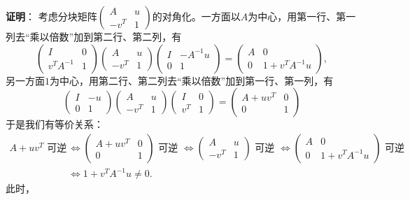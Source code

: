 {\bf 证明}： 考虑分块矩阵$\begin{pmatrix} A & u \\ -v^T & 1 \end{pmatrix}$的对角化。一方面以$A$为中心，用第一行、第一列去``乘以倍数''加到第二行、第二列，有
$$\begin{pmatrix} I & 0 \\ v^TA^{-1} & 1 \end{pmatrix} \begin{pmatrix} A & u \\ -v^T & 1 \end{pmatrix} \begin{pmatrix} I & -A^{-1}u \\ 0 & 1 \end{pmatrix} = \begin{pmatrix} A & 0 \\ 0 & 1 + v^TA^{-1}u \end{pmatrix},$$
另一方面$1$为中心，用第二行、第二列去``乘以倍数''加到第一行、第一列，有
$$\begin{pmatrix} I & -u \\ 0 & 1 \end{pmatrix} \begin{pmatrix} A & u \\ -v^T & 1 \end{pmatrix} \begin{pmatrix} I & 0 \\ v^T & 1 \end{pmatrix} = \begin{pmatrix} A + uv^T & 0 \\ 0 & 1 \end{pmatrix}$$
于是我们有等价关系：
\begin{align*}
A + uv^T \text{ 可逆 } & \Longleftrightarrow \begin{pmatrix} A + uv^T & 0 \\ 0 & 1 \end{pmatrix} \text{ 可逆 } \Longleftrightarrow \begin{pmatrix} A & u \\ -v^T & 1 \end{pmatrix} \text{ 可逆 } \Longleftrightarrow \begin{pmatrix} A & 0 \\ 0 & 1 + v^TA^{-1}u \end{pmatrix} \text{ 可逆 } \\
& \Longleftrightarrow 1 + v^TA^{-1}u \neq 0.
\end{align*}
此时，
